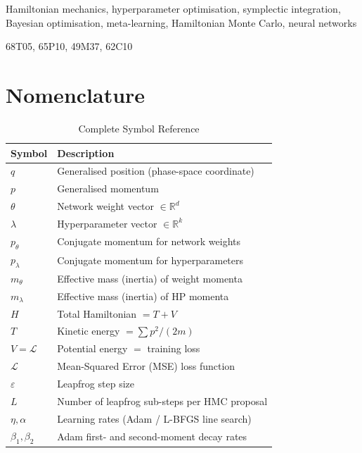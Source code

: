 \documentclass[12pt,a4paper]{article}
\begin{document}
\begin{keywords}
Hamiltonian mechanics, hyperparameter optimisation, symplectic integration,
Bayesian optimisation, meta-learning, Hamiltonian Monte Carlo, neural networks
\end{keywords}

\begin{MSCcodes}
68T05, 65P10, 49M37, 62C10
\end{MSCcodes}

\section{Nomenclature}

\begin{table}[tb]
\centering
\caption{Complete Symbol Reference}
\label{tab:nomenclature}
\renewcommand{\arraystretch}{1.35}
\begin{tabular}{>{\bfseries}p{1.45cm} p{6.0cm}}
\toprule
Symbol & Description \\
\midrule
$q$              & Generalised position (phase-space coordinate) \\
$p$              & Generalised momentum \\
$\theta$         & Network weight vector $\in\mathbb{R}^d$ \\
$\lambda$        & Hyperparameter vector $\in\mathbb{R}^k$ \\
$p_\theta$       & Conjugate momentum for network weights \\
$p_\lambda$      & Conjugate momentum for hyperparameters \\
$m_\theta$       & Effective mass (inertia) of weight momenta \\
$m_\lambda$      & Effective mass (inertia) of HP momenta \\
$H$              & Total Hamiltonian $= T + V$ \\
$T$              & Kinetic energy $= \sum p^2 / (2m)$ \\
$V = \mathcal{L}$& Potential energy $=$ training loss \\
$\mathcal{L}$    & Mean-Squared Error (MSE) loss function \\
$\varepsilon$    & Leapfrog step size \\
$L$              & Number of leapfrog sub-steps per HMC proposal \\
$\eta,\alpha$    & Learning rates (Adam / L-BFGS line search) \\
$\beta_1,\beta_2$& Adam first- and second-moment decay rates \\

\end{tabular}
\end{table}
\end{document}
